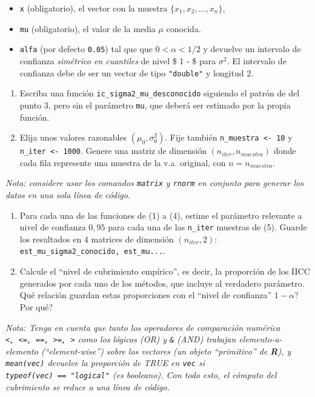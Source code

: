 \documentclass[
]{article}
\providecommand{\tightlist}{%
  \setlength{\itemsep}{0pt}\setlength{\parskip}{0pt}}
\begin{document}
\begin{itemize}
\tightlist
\item
  \texttt{x} (obligatorio), el vector con la muestra
  \(\{ x_1, x_2, \dots, x_n \}\),
\item
  \texttt{mu} (obligatorio), el valor de la media \(\mu\) conocida.
\item
  \texttt{alfa} (por defecto \texttt{0.05}) tal que que
  \(0 < \alpha < 1/2\) y devuelve un intervalo de confianza
  \emph{simétrico en cuantiles} de nivel \$ 1 - \alpha\$ para
  \(\sigma^2\). El intervalo de confianza debe de ser un vector de tipo
  \texttt{"double"} y longitud 2.
\end{itemize}

\begin{enumerate}
\def\labelenumi{\arabic{enumi}.}
\setcounter{enumi}{3}
\item
  Escriba una función \texttt{ic\_sigma2\_mu\_desconocido} siguiendo el
  patrón de del punto 3, pero sin el parámetro \texttt{mu}, que deberá
  ser estimado por la propia función.
\item
  Elija unos valores razonables \((\mu_0, \sigma^2_0)\). Fije también
  \texttt{n\_muestra\ \textless{}-\ 10} y
  \texttt{n\_iter\ \textless{}-\ 1000}. Genere una matriz de dimensión
  \((n_{iter}, n_{muestra})\) donde cada fila represente una muestra de
  la v.a. original, con \(n = n_{muestra}\).
\end{enumerate}

\emph{Nota: considere usar los comandos \texttt{matrix} y \texttt{rnorm}
en conjunto para generar los datos en una sola línea de código.}

\begin{enumerate}
\def\labelenumi{\arabic{enumi}.}
\setcounter{enumi}{5}
\item
  Para cada una de las funciones de (1) a (4), estime el parámetro
  relevante a nivel de confianza \(0,95\) para cada una de las
  \texttt{n\_iter} muestras de (5). Guarde los resultados en 4 matrices
  de dimensión \((n_{iter}, 2)\):
  \texttt{est\_mu\_sigma2\_conocido,\ est\_mu...}.
\item
  Calcule el ``nivel de cubrimiento empírico'', es decir, la proporción
  de los IICC generados por cada uno de los métodos, que incluye al
  verdadero parámetro. Qué relación guardan estas proporciones con el
  ``nivel de confianza'' \(1 - \alpha\)? Por qué?
\end{enumerate}

\emph{Nota: Tenga en cuenta que tanto los operadores de comparación
numérica
\texttt{\textless{},\ \textless{}=,\ ==,\ \textgreater{}=,\ \textgreater{}}
como los lógicos \texttt{\textbar{}} (OR) y \texttt{\&} (AND) trabajan
elemento-a-elemento (``element-wise'') sobre los vectores (un objeto
``primitivo'' de \textbf{R}), y \texttt{mean(vec)} devuelve la
proporción de TRUE en \texttt{vec} si
\texttt{typeof(vec)\ ==\ "logical"} (es booleano). Con todo esto, el
cómputo del cubrimiento se reduce a una línea de código.}
\end{document}
